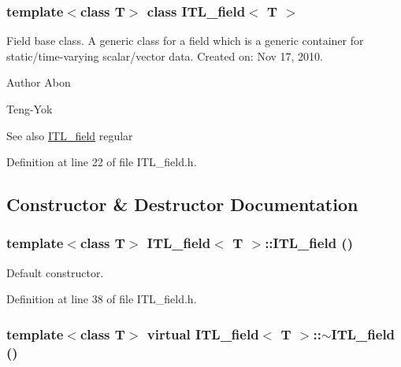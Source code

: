 \subsubsection*{template$<$class T$>$ class ITL\_\-field$<$ T $>$}

Field base class. A generic class for a field which is a generic container for static/time-\/varying scalar/vector data. Created on: Nov 17, 2010. \begin{DoxyAuthor}{Author}
Abon 

Teng-\/Yok 
\end{DoxyAuthor}
\begin{DoxySeeAlso}{See also}
\hyperlink{classITL__field}{ITL\_\-field} regular 
\end{DoxySeeAlso}


Definition at line 22 of file ITL\_\-field.h.



\subsection{Constructor \& Destructor Documentation}
\hypertarget{classITL__field_acbb918b7ab99fe46d837465d16d4adab}{
\subsubsection[{ITL\_\-field}]{\setlength{\rightskip}{0pt plus 5cm}template$<$class T$>$ {\bf ITL\_\-field}$<$ T $>$::{\bf ITL\_\-field} ()}}
\label{classITL__field_acbb918b7ab99fe46d837465d16d4adab}


Default constructor. 



Definition at line 38 of file ITL\_\-field.h.

\hypertarget{classITL__field_aa8ace26f8abdf8a2d7a94ea27f0e7a16}{
\subsubsection[{$\sim$ITL\_\-field}]{\setlength{\rightskip}{0pt plus 5cm}template$<$class T$>$ virtual {\bf ITL\_\-field}$<$ T $>$::$\sim${\bf ITL\_\-field} ()}}
\label{classITL__field_aa8ace26f8abdf8a2d7a94ea27f0e7a16}


